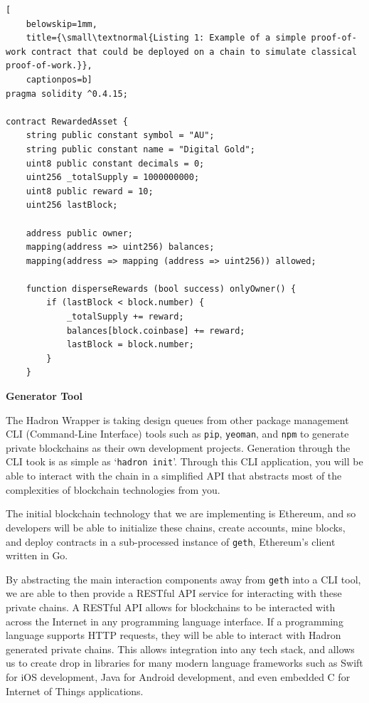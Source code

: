 \documentclass{%
	article}
\begin{document}
\begin{lstlisting}[
	belowskip=1mm,
	title={\small\textnormal{Listing 1: Example of a simple proof-of-work contract that could be deployed on a chain to simulate classical proof-of-work.}},
	captionpos=b]
pragma solidity ^0.4.15;

contract RewardedAsset {
    string public constant symbol = "AU";
    string public constant name = "Digital Gold";
    uint8 public constant decimals = 0;
    uint256 _totalSupply = 1000000000;
    uint8 public reward = 10;
    uint256 lastBlock;

    address public owner;
    mapping(address => uint256) balances;
    mapping(address => mapping (address => uint256)) allowed;

    function disperseRewards (bool success) onlyOwner() {
        if (lastBlock < block.number) {
            _totalSupply += reward;
            balances[block.coinbase] += reward;
            lastBlock = block.number;
        }
    }

\end{lstlisting}

\begin{center}
\textbf{Generator Tool}
\end{center}

The Hadron Wrapper is taking design queues from other package management CLI (Command-Line Interface) tools such as \texttt{pip}\cite{pip}, \texttt{yeoman}\cite{yeoman}, and \texttt{npm}\cite{npm} to generate private blockchains as their own development projects. Generation through the CLI took is as simple as ‘\texttt{hadron init}’. Through this CLI application, you will be able to interact with the chain in a simplified API that abstracts most of the complexities of blockchain technologies from you.

The initial blockchain technology that we are implementing is Ethereum, and so developers will be able to initialize these chains, create accounts, mine blocks, and deploy contracts in a sub-processed instance of \texttt{geth}, Ethereum’s client written in Go.

By abstracting the main interaction components away from \texttt{geth} into a CLI tool, we are able to then provide a RESTful API service for interacting with these private chains. A RESTful API allows for blockchains to be interacted with across the Internet in any programming language interface. If a programming language supports HTTP requests, they will be able to interact with Hadron generated private chains. This allows integration into any tech stack, and allows us to create drop in libraries for many modern language frameworks such as Swift for iOS development, Java for Android development, and even embedded C for Internet of Things applications.
\end{document}
